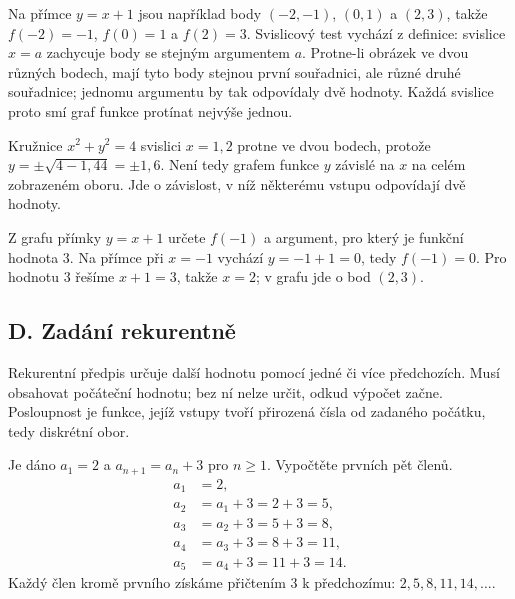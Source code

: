 \documentclass[11pt,a4paper]{article}
\begin{document}
Na přímce $y=x+1$ jsou například body $(-2,-1)$, $(0,1)$ a $(2,3)$, takže $f(-2)=-1$, $f(0)=1$ a $f(2)=3$. Svislicový test vychází z definice: svislice $x=a$ zachycuje body se stejným argumentem $a$. Protne-li obrázek ve dvou různých bodech, mají tyto body stejnou první souřadnici, ale různé druhé souřadnice; jednomu argumentu by tak odpovídaly dvě hodnoty. Každá svislice proto smí graf funkce protínat nejvýše jednou.

\begin{center}
\end{center}

Kružnice $x^2+y^2=4$ svislici $x=1{,}2$ protne ve dvou bodech, protože $y=\pm\sqrt{4-1{,}44}=\pm1{,}6$. Není tedy grafem funkce $y$ závislé na $x$ na celém zobrazeném oboru. Jde o závislost, v níž některému vstupu odpovídají dvě hodnoty.

\begin{prikladReseniBox}
Z grafu přímky $y=x+1$ určete $f(-1)$ a argument, pro který je funkční hodnota $3$.
\tcblower
Na přímce při $x=-1$ vychází $y=-1+1=0$, tedy $f(-1)=0$. Pro hodnotu $3$ řešíme $x+1=3$, takže $x=2$; v grafu jde o bod $(2,3)$.
\end{prikladReseniBox}

\subsection*{D. Zadání rekurentně}
Rekurentní předpis určuje další hodnotu pomocí jedné či více předchozích. Musí obsahovat počáteční hodnotu; bez ní nelze určit, odkud výpočet začne. Posloupnost je funkce, jejíž vstupy tvoří přirozená čísla od zadaného počátku, tedy diskrétní obor.

\begin{prikladReseniBox}
Je dáno $a_1=2$ a $a_{n+1}=a_n+3$ pro $n\geq1$. Vypočtěte prvních pět členů.
\tcblower
\begin{align*}
a_1&=2,\\
a_2&=a_1+3=2+3=5,\\
a_3&=a_2+3=5+3=8,\\
a_4&=a_3+3=8+3=11,\\
a_5&=a_4+3=11+3=14.
\end{align*}
Každý člen kromě prvního získáme přičtením $3$ k předchozímu: $2,5,8,11,14,\ldots$.
\end{prikladReseniBox}
\end{document}
